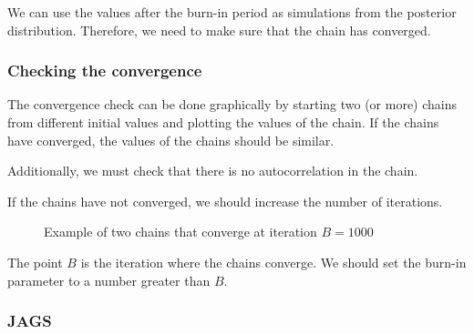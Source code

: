 We can use the values after the burn-in period as simulations from the posterior distribution.
Therefore, we need to make sure that the chain has converged.

\subsubsection{Checking the convergence}

The convergence check can be done graphically by starting two (or more) chains
from different initial values and plotting the values of the chain. If the
chains have converged, the values of the chains should be similar.

Additionally, we must check that there is no autocorrelation in the chain.

If the chains have not converged, we should increase the number of iterations.

\begin{figure}[H]
    \caption{Example of two chains that converge at iteration $B = 1000$}
\end{figure}

The point $B$ is the iteration where the chains converge. We should set the burn-in parameter
to a number greater than $B$.

\subsubsection{JAGS}

